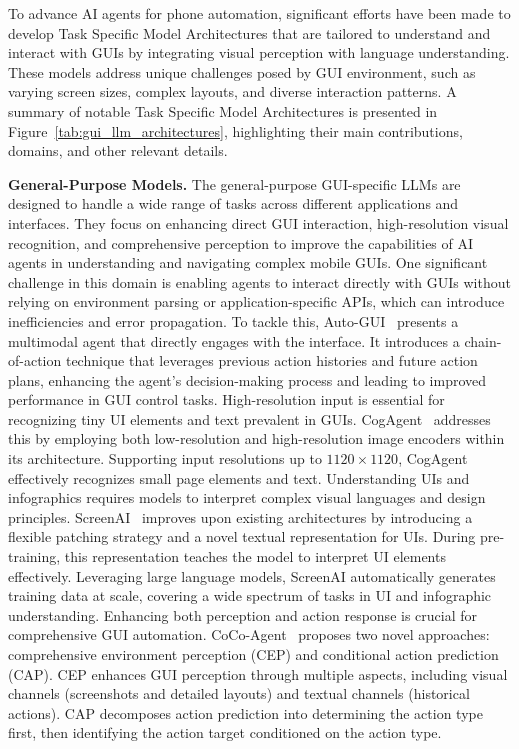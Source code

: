 To advance AI agents for phone automation, significant efforts have been made to develop Task Specific Model Architectures that are tailored to understand and interact with GUIs by integrating visual perception with language understanding. These models address unique challenges posed by GUI environment, such as varying screen sizes, complex layouts, and diverse interaction patterns. A summary of notable Task Specific Model Architectures is presented in Figure~\ref{tab:gui_llm_architectures}, highlighting their main contributions, domains, and other relevant details.


\noindent\textbf{General-Purpose Models.}
The general-purpose GUI-specific LLMs are designed to handle a wide range of tasks across different applications and interfaces. They focus on enhancing direct GUI interaction, high-resolution visual recognition, and comprehensive perception to improve the capabilities of AI agents in understanding and navigating complex mobile GUIs.
One significant challenge in this domain is enabling agents to interact directly with GUIs without relying on environment parsing or application-specific APIs, which can introduce inefficiencies and error propagation. To tackle this, Auto-GUI~\cite{zhang2023youautoui} presents a multimodal agent that directly engages with the interface. It introduces a chain-of-action technique that leverages previous action histories and future action plans, enhancing the agent's decision-making process and leading to improved performance in GUI control tasks.
High-resolution input is essential for recognizing tiny UI elements and text prevalent in GUIs. CogAgent~\cite{hong2024cogagent} addresses this by employing both low-resolution and high-resolution image encoders within its architecture. Supporting input resolutions up to $1120 \times 1120$, CogAgent effectively recognizes small page elements and text.
Understanding UIs and infographics requires models to interpret complex visual languages and design principles. ScreenAI~\cite{baechler2024screenai} improves upon existing architectures by introducing a flexible patching strategy and a novel textual representation for UIs. During pre-training, this representation teaches the model to interpret UI elements effectively. Leveraging large language models, ScreenAI automatically generates training data at scale, covering a wide spectrum of tasks in UI and infographic understanding.
Enhancing both perception and action response is crucial for comprehensive GUI automation. CoCo-Agent~\cite{ma2024coco} proposes two novel approaches: comprehensive environment perception (CEP) and conditional action prediction (CAP). CEP enhances GUI perception through multiple aspects, including visual channels (screenshots and detailed layouts) and textual channels (historical actions). CAP decomposes action prediction into determining the action type first, then identifying the action target conditioned on the action type.
